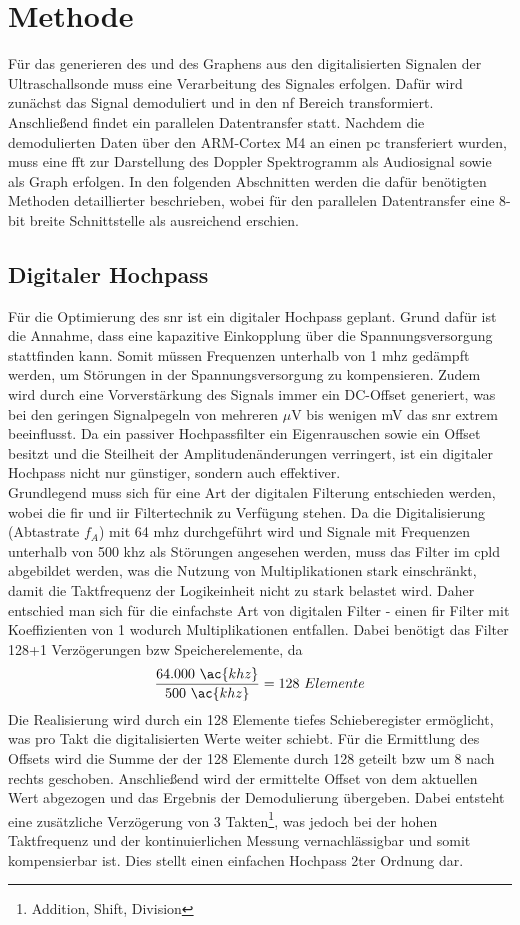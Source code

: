 \section{Methode}
Für das generieren des  und des  Graphens aus den digitalisierten Signalen der Ultraschallsonde muss eine Verarbeitung des Signales erfolgen. Dafür wird zunächst das Signal demoduliert und in den \ac{nf} Bereich transformiert. Anschließend findet ein parallelen Datentransfer statt. Nachdem die demodulierten Daten über den ARM-Cortex M4 an einen \ac{pc} transferiert wurden, muss eine \ac{fft} zur Darstellung des Doppler Spektrogramm als Audiosignal sowie als Graph erfolgen. In den folgenden Abschnitten werden die dafür benötigten Methoden detaillierter beschrieben, wobei für den parallelen Datentransfer eine 8-bit breite Schnittstelle als ausreichend erschien.
\subsection{Digitaler Hochpass}\label{sec_digHP}
Für die Optimierung des \ac{snr} ist ein digitaler Hochpass geplant. Grund dafür ist die Annahme, dass eine kapazitive Einkopplung über die Spannungsversorgung stattfinden kann. Somit müssen Frequenzen unterhalb von 1 \ac{mhz} gedämpft werden, um Störungen in der Spannungsversorgung zu kompensieren. Zudem wird durch eine Vorverstärkung des Signals immer ein DC-Offset generiert, was bei den geringen Signalpegeln von mehreren $\mu$V bis wenigen mV das \ac{snr} extrem beeinflusst. Da ein passiver Hochpassfilter ein Eigenrauschen sowie ein Offset besitzt und die Steilheit der Amplitudenänderungen verringert, ist ein digitaler Hochpass nicht nur günstiger, sondern auch effektiver.\\
Grundlegend muss sich für eine Art der digitalen Filterung entschieden werden, wobei die \ac{fir} und \ac{iir} Filtertechnik zu Verfügung stehen. Da die Digitalisierung (Abtastrate $f_A$) mit 64 \ac{mhz} durchgeführt wird und Signale mit Frequenzen unterhalb von 500 \ac{khz} als Störungen angesehen werden, muss das Filter im \ac{cpld} abgebildet werden, was die Nutzung von Multiplikationen stark einschränkt, damit die Taktfrequenz der Logikeinheit nicht zu stark belastet wird. Daher entschied man sich für die einfachste Art von digitalen Filter - einen \ac{fir} Filter mit Koeffizienten von 1 wodurch Multiplikationen entfallen. Dabei benötigt das Filter 128+1 Verzögerungen \ac{bzw} Speicherelemente, da 
\[\dfrac{64.000\ \ac{khz}}{500\ \ac{khz}}=128\ Elemente\]
Die Realisierung wird durch ein 128 Elemente tiefes Schieberegister ermöglicht, was pro Takt die digitalisierten Werte weiter schiebt. Für die Ermittlung des Offsets wird die Summe der der 128 Elemente durch 128 geteilt \ac{bzw} um 8 nach rechts geschoben. Anschließend wird der ermittelte Offset von dem aktuellen Wert abgezogen und das Ergebnis der Demodulierung übergeben. Dabei entsteht eine zusätzliche Verzögerung von 3 Takten\footnote{Addition, Shift, Division}, was jedoch bei der hohen Taktfrequenz und der kontinuierlichen Messung vernachlässigbar und somit kompensierbar ist. Dies stellt einen einfachen Hochpass 2ter Ordnung dar.

